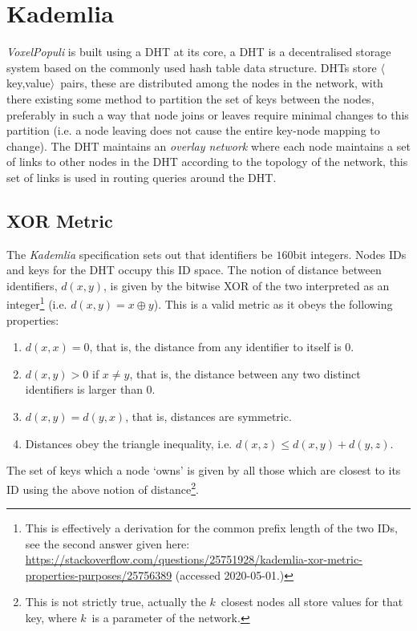 \documentclass[12pt,notitlepage,a4paper]{report}
\newcommand{\kademlia}{\emph{Kademlia}}
\newcommand{\K}{$k$}
\newcommand{\voxpop}{\emph{VoxelPopuli}}
\begin{document}
	\section{Kademlia}
	\voxpop{} is built using a DHT at its core, a DHT is a decentralised storage system based on the commonly used hash table data structure. DHTs store $\langle$key,value$\rangle$~pairs, these are distributed among the nodes in the network, with there existing some method to partition the set of keys between the nodes, preferably in such a way that node joins or leaves require minimal changes to this partition (i.e. a node leaving does not cause the entire key-node mapping to change). The DHT maintains an \emph{overlay network} where each node maintains a set of links to other nodes in the DHT according to the topology of the network, this set of links is used in routing queries around the DHT.
	
	\subsection{XOR Metric}
	The \kademlia{} specification sets out that identifiers be $160$bit integers. Nodes IDs and keys for the DHT occupy this ID space. The notion of distance between identifiers, $d(x,y)$, is given by the bitwise XOR of the two interpreted as an integer\footnote{This is effectively a derivation for the common prefix length of the two IDs, see the second answer given here: \url{https://stackoverflow.com/questions/25751928/kademlia-xor-metric-properties-purposes/25756389} (accessed 2020-05-01.)} (i.e. $d(x,y) = x \oplus y$). This is a valid metric as it obeys the following properties:
	\begin{enumerate}
		\item $d(x,x) = 0$, that is, the distance from any identifier to itself is $0$.
		\item $d(x,y) > 0$ if $x \neq y$, that is, the  distance between any two distinct identifiers is larger than $0$.
		\item $d(x,y) = d(y,x)$, that is, distances are symmetric.
		\item Distances obey  the triangle inequality, i.e. $d(x,z) \leq d(x,y) + d(y,z)$.
	\end{enumerate}
	The set of keys which a node `owns' is given by all those which are closest to its ID using the above notion of distance\footnote{This is not strictly true, actually the \K~closest nodes all store values for that key, where \K~is a parameter of the network.}.
	
\end{document}
